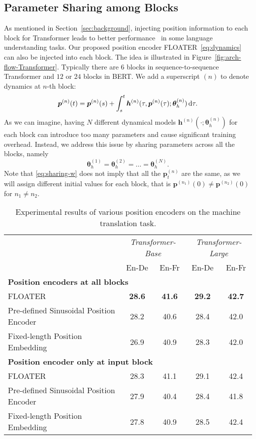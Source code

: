 \documentclass[11pt]{article}
\def\vtheta{{\bm{\theta}}}
\def\vh{{\bm{h}}}
\def\vp{{\bm{p}}}
\begin{document}
\subsection{Parameter Sharing among Blocks}
As mentioned in Section~\ref{sec:background}, injecting position information to each block for Transformer leads to better performance~\cite{dehghani2018universal,lan2019albert} in some language understanding tasks. Our proposed position encoder FLOATER~\eqref{eq:dynamics} can also be injected into each block. The idea is illustrated in Figure~\ref{fig:arch-flow-Transformer}. 
Typically there are $6$ blocks in sequence-to-sequence Transformer and $12$ or $24$ blocks in BERT. We add a superscript $(n)$ to denote dynamics at $n$-th block: 
\begin{equation*}
\vp^{(n)}(t) = \vp^{(n)}(s) + \int_s^t\vh^{(n)}(\tau, \vp^{(n)}(\tau);\vtheta_h^{(n)})\dif \tau.
\end{equation*}
As we can imagine, having $N$ different dynamical models $\vh^{(n)}(\cdot;\vtheta_h^{(n)})$ for each block can introduce too many parameters and  cause significant training overhead. Instead, we address this issue by sharing parameters across all the blocks, namely
\begin{equation}
    \label{eq:sharing-w}
    \vtheta_h^{(1)}=\vtheta_h^{(2)}=\dots=\vtheta_h^{(N)}.
\end{equation}
Note that \eqref{eq:sharing-w} does not imply that all the $\vp_t^{(n)}$ are the same, as we will assign different initial values for each block, that is  $\vp^{(n_1)}(0)\ne\vp^{(n_2)}(0)$ for $n_1 \ne n_2$.
\begin{table*}[htb]
    \centering
    \begin{tabular}{lcccc}
    \toprule
       &\multicolumn{2}{c}{\textit{Transformer-Base}} & \multicolumn{2}{c}{\textit{Transformer-Large}}  \\  
       & En-De & En-Fr & En-De & En-Fr  \\
       \midrule
        \multicolumn{5}{l}{\bf Position encoders at all blocks} \\
        FLOATER & \textbf{28.6} & \textbf{41.6} & \textbf{29.2} & \textbf{42.7}\\
        Pre-defined Sinusoidal Position Encoder & 28.2 & 40.6 & 28.4 & 42.0 \\
        Fixed-length Position Embedding & 26.9 & 40.9 & 28.3& 42.0 \\
       \midrule
        \multicolumn{5}{l}{\bf Position encoder only at input block} \\
        FLOATER & 28.3 & 41.1 & 29.1 & 42.4 \\
        Pre-defined Sinusoidal Position Encoder & 27.9 & 40.4 & 28.4 & 41.8 \\
        Fixed-length Position Embedding & 27.8 & 40.9 & 28.5 & 42.4 \\
\bottomrule
    \end{tabular}
    \caption{Experimental results of various position encoders on the machine translation task.} 
    \label{tab:exp-NMT}
\end{table*}
\end{document}
